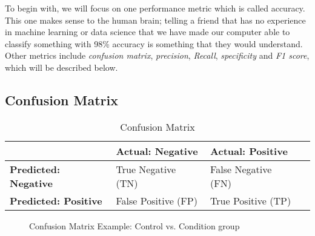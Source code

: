 To begin with, we will focus on one performance metric which is called accuracy. This one makes sense to the human brain; telling a friend that has no experience in machine learning or data science that we have made our computer able to classify something with 98\% accuracy is something that they would understand. Other metrics include \textit{confusion matrix}, \textit{precision}, \textit{Recall}, \textit{specificity} and \textit{F1 score}, which will be described below.

\subsection{Confusion Matrix}

\begin{table}[h]
  \begin{center}
    \begin{tabular}{| l | l | l | l |}
      \hline
                                    & \textbf{Actual: Negative} & \textbf{Actual: Positive} \\ \hline
      \textbf{Predicted: Negative}  & True Negative (TN)        & False Negative (FN)       \\ \hline
      \textbf{Predicted: Positive}  & False Positive (FP)       & True Positive (TP)        \\
      \hline
    \end{tabular}
    \caption{Confusion Matrix}
    \label{table:confusion_matrix}
  \end{center}
\end{table}

\begin{figure}[h]
  \setlength\figureheight{8cm}
  \setlength\figurewidth{8cm}
  
  \caption{Confusion Matrix Example: Control vs. Condition group}
  \label{figure:confusion_matrix_bipolar}
\end{figure}



